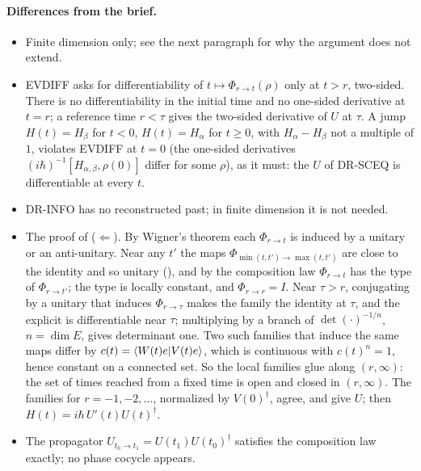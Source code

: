 \documentclass[11pt]{article}
\begin{document}
\paragraph{Differences from the brief.}
\begin{itemize}
\item Finite dimension only; see the next paragraph for why the argument does not extend.
\item EVDIFF asks for differentiability of $t \mapsto \Phi_{r\to t}(\rho)$ only at $t > r$,
  two-sided. There is no differentiability in the initial time and no one-sided derivative at
  $t = r$; a reference time $r < \tau$ gives the two-sided derivative of $U$ at $\tau$. A jump
  $H(t) = H_\beta$ for $t < 0$, $H(t) = H_\alpha$ for $t \ge 0$, with $H_\alpha - H_\beta$ not a
  multiple of $1$, violates EVDIFF at $t = 0$ (the one-sided derivatives
  $(i\hbar)^{-1}[H_{\alpha,\beta}, \rho(0)]$ differ for some $\rho$), as it must: the $U$ of
  DR-SCEQ is differentiable at every $t$.
\item DR-INFO has no reconstructed past; in finite dimension it is not needed.
\item The proof of ($\Leftarrow$). By Wigner's theorem each $\Phi_{r\to t}$ is induced by a unitary
  or an anti-unitary. Near any $t'$ the maps $\Phi_{\min(t,t')\to\max(t,t')}$ are close to the
  identity and so unitary (), and by the composition law
  $\Phi_{r\to t}$ has the type of $\Phi_{r\to t'}$; the type is locally constant, and
  $\Phi_{r\to r} = I$. Near $\tau > r$, conjugating by a unitary that induces $\Phi_{r\to\tau}$
  makes the family the identity at $\tau$, and the explicit  is
  differentiable near $\tau$; multiplying by a branch of $\det(\cdot)^{-1/n}$, $n = \dim E$, gives
  determinant one. Two such families that induce the same maps differ by
  $c(t) = \braket{W(t)e|V(t)e}$, which is continuous with $c(t)^n = 1$, hence constant on a
  connected set. So the local families glue along $(r, \infty)$: the set of times reached from a
  fixed time is open and closed in $(r, \infty)$. The families for $r = -1, -2, \ldots$,
  normalized by $V(0)^\dagger$, agree, and give $U$; then $H(t) = i\hbar\,U'(t)U(t)^\dagger$.
\item The propagator $U_{t_0\to t_1} = U(t_1)U(t_0)^\dagger$ satisfies the composition law
  exactly; no phase cocycle appears.
\end{itemize}
\end{document}
